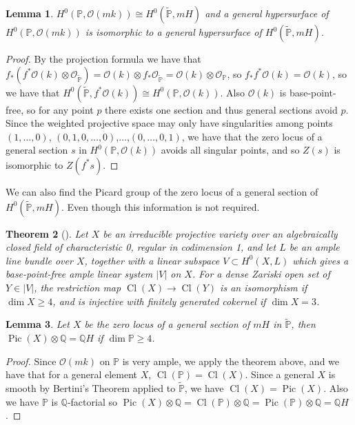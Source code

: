 \documentclass{amsart}
\newtheorem{theorem}{Theorem}[section]
\newtheorem{lemma}[theorem]{Lemma}
\theoremstyle{definition}
\theoremstyle{remark}
\begin{document}
\begin{lemma}
$H^0(\mathbb{P}, \mathcal O(mk)) \cong  H^0(\widetilde{\mathbb{P}}, mH)$ and a general hypersurface of \(H^0(\mathbb{P}, \mathcal O(mk))\) is isomorphic to a general hypersurface of \(H^0(\widetilde{\mathbb{P}}, mH)\).
\end{lemma}
\begin{proof}
    
By the projection formula we have that $f_*(f^*\mathcal{O}(k)\otimes \mathcal{O}_{\widetilde{\mathbb{P}}}) = \mathcal{O}(k)\otimes f_*\mathcal{O}_{\widetilde{\mathbb{P}}} = \mathcal{O}(k)\otimes \mathcal{O}_{\mathbb{P}}$, so $f_*f^*\mathcal{O}(k) = \mathcal{O}(k)$, so we have that $H^0(\widetilde{\mathbb{P}}, f^*\mathcal{O}(k)) \cong H^0(\mathbb{P}, \mathcal{O}(k))$. Also $\mathcal O(k)$ is base-point-free, so for any point $p$ there exists one section and thus general sections avoid $p$. Since the weighted projective space may only have singularities among points $(1,\dots,0)$, $(0,1,0,\dots,0)$,$\dots$,$(0,\dots,0,1)$, we have that the zero locus of a general section $s$ in $H^0(\mathbb{P}, \mathcal{O}(k))$ avoids all singular points, and so $Z(s)$ is isomorphic to $Z(f^*s)$.
\end{proof}
We can also find the Picard group of the zero locus of a general section of $H^0(\widetilde{\mathbb{P}}, mH)$.
Even though this information is not required.

\begin{theorem}[{\cite[Theorem 1]{ravindra2005grothendiecklefschetztheoremnormalprojective}}]
Let $X$ be an irreducible projective variety over an algebraically closed field of characteristic 0, regular in codimension 1, and let $L$ be an ample line bundle over $X$, together with a linear subspace $V \subset H^0(X, L)$ which gives a base-point-free ample linear system $|V|$ on $X$. For a dense Zariski open set of $Y \in |V|$, the restriction map $\operatorname{Cl}(X) \to \operatorname{Cl}(Y)$ is an isomorphism if $\dim X \geq 4$, and is injective with finitely generated cokernel if $\dim X = 3$.
\end{theorem}
\begin{lemma}
Let $X$ be the zero locus of a general section of $mH$ in $\widetilde{\mathbb{P}}$, then $\operatorname{Pic}(X)\otimes \mathbb{Q} = \mathbb{Q} H$ if $\operatorname{dim } \mathbb P\geq4$.
\end{lemma}
\begin{proof}
    Since $\mathcal O(mk)$ on $\mathbb P$ is very ample, we apply the theorem above, and we have that for a general element $X$, $\operatorname{Cl}(\mathbb{P}) = \operatorname{Cl}(X)$. Since a general $X$ is smooth by Bertini's Theorem applied to $\widetilde{\mathbb P}$, we have $\operatorname{Cl}(X) = \operatorname{Pic}(X)$. Also we have $\mathbb{P}$ is $\mathbb{Q}$-factorial so $\operatorname{Pic}(X) \otimes \mathbb{Q} = \operatorname{Cl}(\mathbb P)\otimes \mathbb Q = \operatorname{Pic}(\mathbb P) \otimes \mathbb{Q} = \mathbb{Q}H$.
\end{proof}
\end{document}
